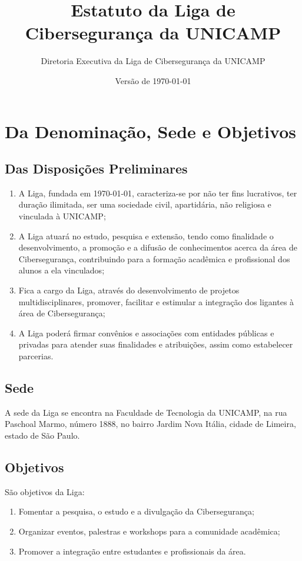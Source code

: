 \documentclass[11pt, a4paper]{article}
\title{Estatuto da Liga de Cibersegurança da UNICAMP}
\author{Diretoria Executiva da Liga de Cibersegurança da UNICAMP}
\date{Versão de \today}
\begin{document}
\maketitle

\tableofcontents

\newpage


\section{Da Denominação, Sede e Objetivos}
\label{sec:denominacao}

\subsection{Das Disposições Preliminares}
\label{sec:denominacao-natureza}
\begin{enumerate}[label=Art. \arabic*.]
    \item A Liga, fundada em \today, caracteriza-se por não ter fins lucrativos, ter duração ilimitada, ser uma sociedade civil, apartidária, não religiosa e vinculada à UNICAMP;
    \item A Liga atuará no estudo, pesquisa e extensão, tendo como finalidade o desenvolvimento, a promoção e a difusão de conhecimentos acerca da área de Cibersegurança, contribuindo para a formação acadêmica e profissional dos alunos a ela vinculados;
    \item Fica a cargo da Liga, através do desenvolvimento de projetos multidisciplinares, promover, facilitar e estimular a integração dos ligantes à área de Cibersegurança;
    \item A Liga poderá firmar convênios e associações com entidades públicas e privadas para atender suas finalidades e atribuições, assim como estabelecer parcerias.
\end{enumerate}


\subsection{Sede}
A sede da Liga se encontra na Faculdade de Tecnologia da UNICAMP, na rua Paschoal Marmo, número 1888, no bairro Jardim Nova Itália, cidade de Limeira, estado de São Paulo.

\subsection{Objetivos}
São objetivos da Liga:
\begin{enumerate}[label=\alph*)]
    \item Fomentar a pesquisa, o estudo e a divulgação da Cibersegurança;
    \item Organizar eventos, palestras e workshops para a comunidade acadêmica;
    \item Promover a integração entre estudantes e profissionais da área.
\end{enumerate}
\end{document}
